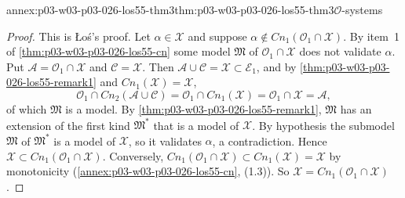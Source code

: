 \begin{annexitem}{annex:p03-w03-p03-026-los55-thm3}{thm:p03-w03-p03-026-los55-thm3}{\(\mathcal O\)-systems}
\begin{proof}
This is \L o\'s's proof.  Let \(\alpha\in\mathcal X\) and suppose
\(\alpha\notin\mathit{Cn}_1(\mathcal O_1\cap\mathcal X)\).  By item~1 of
\cref{thm:p03-w03-p03-026-los55-cn} some model \(\mathfrak M\) of
\(\mathcal O_1\cap\mathcal X\) does not validate \(\alpha\).  Put
\(\mathcal A=\mathcal O_1\cap\mathcal X\) and \(\mathcal C=\mathcal X\).  Then
\(\mathcal A\cup\mathcal C=\mathcal X\subset\mathcal E_1\), and by
\cref{thm:p03-w03-p03-026-los55-remark1} and \(\mathit{Cn}_1(\mathcal X)=\mathcal X\),
\[
 \mathcal O_1\cap\mathit{Cn}_2(\mathcal A\cup\mathcal C)
 =\mathcal O_1\cap\mathit{Cn}_1(\mathcal X)=\mathcal O_1\cap\mathcal X=\mathcal A ,
\]
of which \(\mathfrak M\) is a model.  By
\cref{thm:p03-w03-p03-026-los55-remark1}, \(\mathfrak M\) has an extension of
the first kind \(\mathfrak M^*\) that is a model of \(\mathcal X\).  By
hypothesis the submodel \(\mathfrak M\) of \(\mathfrak M^*\) is a model of
\(\mathcal X\), so it validates \(\alpha\), a contradiction.  Hence
\(\mathcal X\subset\mathit{Cn}_1(\mathcal O_1\cap\mathcal X)\).  Conversely,
\(\mathit{Cn}_1(\mathcal O_1\cap\mathcal X)\subset\mathit{Cn}_1(\mathcal X)=\mathcal X\)
by monotonicity (\cref{annex:p03-w03-p03-026-los55-cn}, (1.3)).  So
\(\mathcal X=\mathit{Cn}_1(\mathcal O_1\cap\mathcal X)\).
\end{proof}
\end{annexitem}


